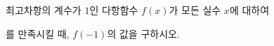 최고차항의 계수가 $1$인 다항함수 $f(x)$가 모든 실수 $x$에 대하여 \par\smallskip{}\par\smallskip\noindent 를 만족시킬 때, $f(-1)$의 값을 구하시오.
